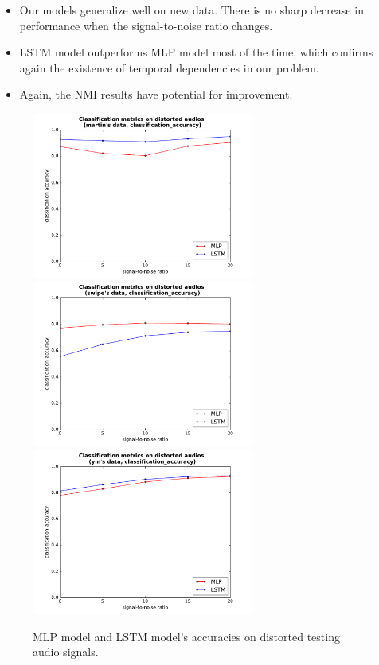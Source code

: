 \documentclass[11pt,a4paper]{report}
\begin{document}
\begin{itemize}
  \item Our models generalize well on new data.
    There is no sharp decrease in performance when the signal-to-noise ratio changes.
  \item LSTM model outperforms MLP model most of the time, which confirms again the existence of temporal dependencies in our problem.
  \item Again, the NMI results have potential for improvement.
\end{itemize}

\begin{figure}[htbp]
  \centering
  \includegraphics[width=0.65\textwidth]{classification_metrics_whole_martin_classification_accuracy.pdf}
  \includegraphics[width=0.65\textwidth]{classification_metrics_whole_swipe_classification_accuracy.pdf}
  \includegraphics[width=0.65\textwidth]{classification_metrics_whole_yin_classification_accuracy.pdf}
  \caption{MLP model and LSTM model's accuracies on distorted testing audio signals.}
  \label{fig:distorted-testing-data-accuracy-whole}
\end{figure}
\end{document}
